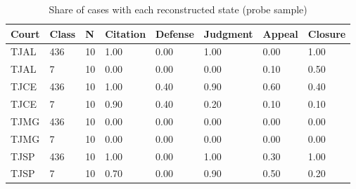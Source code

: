 \begin{table}[htbp]\centering
\caption{Share of cases with each reconstructed state (probe sample)}\label{tab:audit}
\begin{tabular}{llllllll}
\toprule
Court & Class & N & Citation & Defense & Judgment & Appeal & Closure
\\ \midrule
TJAL & 436 & 10 & 1.00 & 0.00 & 1.00 & 0.00 & 1.00 \\
TJAL & 7 & 10 & 0.00 & 0.00 & 0.00 & 0.10 & 0.50 \\
TJCE & 436 & 10 & 1.00 & 0.40 & 0.90 & 0.60 & 0.40 \\
TJCE & 7 & 10 & 0.90 & 0.40 & 0.20 & 0.10 & 0.10 \\
TJMG & 436 & 10 & 0.00 & 0.00 & 0.00 & 0.00 & 0.00 \\
TJMG & 7 & 10 & 0.00 & 0.00 & 0.00 & 0.00 & 0.00 \\
TJSP & 436 & 10 & 1.00 & 0.00 & 1.00 & 0.30 & 1.00 \\
TJSP & 7 & 10 & 0.70 & 0.00 & 0.90 & 0.50 & 0.20 \\
\bottomrule
\end{tabular}\end{table}

